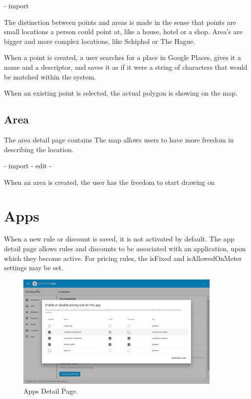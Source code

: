 - import

The distinction between points and areas is made in the sense that points are small locations a person could point at, like a house, hotel or a shop. Area's are bigger and more complex locations, like Schiphol or The Hague.

When a point is created, a user searches for a place in Google Places, gives it a name and a descriptor, and saves it as if it were a string of characters that would be matched within the system.

When an existing point is selected, the actual polygon is showing on the map.

\subsection{Area}
The area detail page contains
The map allows users to have more freedom in describing the location.

- import
- edit
-

When an area is created, the user has the freedom to start drawing on



\section{Apps}
When a new rule or discount is saved, it is not activated by default. The app detail page allows rules and discounts to be associated with an application, upon which they become active. For pricing rules, the isFixed and isAllowedOnMeter settings may be set.

\begin{figure}[H]
	\centering
	\includegraphics[width=0.9\textwidth]{Apps}
	\caption[Apps Detail Page]{Apps Detail Page.}
	\label{fig:Apps Detail Page}
\end{figure}

